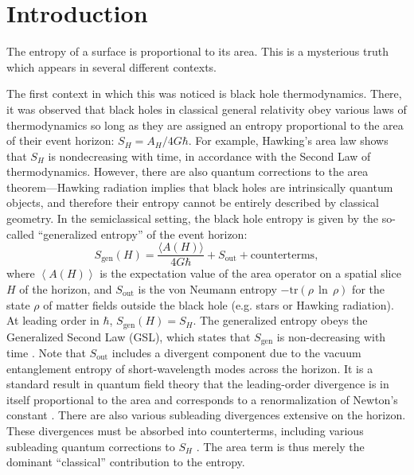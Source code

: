 \documentclass[12pt]{article}
\theoremstyle{remark}
\numberwithin{equation}{section}
\numberwithin{equation}{section}
\begin{document}
\newpage


\tableofcontents

\baselineskip16pt


\section{Introduction}\label{intro}
The entropy of a surface is proportional to its area.  This is a mysterious truth which appears in several different contexts.

The first context in which this was noticed is black hole thermodynamics.  There, it was observed that black holes in classical general relativity obey various laws of thermodynamics so long as they are assigned an entropy proportional to the area of their event horizon: $S_H = A_H/4G\hbar$.  For example, Hawking's area law \cite{Hawking71} shows that $S_{H}$ is nondecreasing with time, in accordance with the Second Law of thermodynamics.   However, there are also quantum corrections to the area theorem---Hawking radiation implies that black holes are intrinsically quantum objects, and therefore their entropy cannot be entirely described by classical geometry.  In the semiclassical setting, the black hole entropy is given by the so-called ``generalized entropy'' of the event horizon:
\begin{equation}
S_\mathrm{gen}(H) = \frac{\langle A (H) \rangle}{4G\hbar} + S_\mathrm{out} + \mathrm{counterterms}, \label{Sgen}
\end{equation}
where $\left \langle A(H)\right\rangle$ is the expectation value of the area operator on a spatial slice $H$ of the horizon, and $S_\mathrm{out}$ is the von Neumann entropy $-\mathrm{tr}(\rho\,\ln\,\rho)$ for the state $\rho$ of matter fields outside the black hole (e.g. stars or Hawking radiation).  At leading order in $\hbar$, $S_{\text{gen}}(H)=S_{H}$. The generalized entropy obeys the Generalized Second Law (GSL), which states that $S_{\text{gen}}$ is non-decreasing with time \cite{Bekenstein73, Hawking75}. Note that $S_\mathrm{out}$ includes a divergent component due to the vacuum entanglement entropy of short-wavelength modes across the horizon. It is a standard result in quantum field theory that the leading-order divergence is in itself proportional to the area \cite{Srednicki93} and corresponds to a renormalization of Newton's constant \cite{SusskindUglum}. There are also various subleading divergences extensive on the horizon.  These divergences must be absorbed into counterterms, including various subleading quantum corrections to $S_H$ \cite{33}.  The area term is thus merely the dominant ``classical'' contribution to the entropy.
\end{document}
